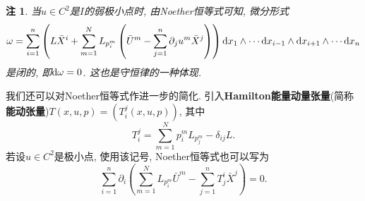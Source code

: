 \documentclass[12pt,a4paper]{article}
\newtheorem{remark}[theorem]{注}
\begin{document}
\begin{remark}
    当$u \in C^2$是$I$的弱极小点时, 由Noether恒等式可知, 微分形式 
    \begin{equation*}
        \omega = \sum_{i = 1}^n\left(L\bar{X}^i + \sum_{m = 1}^NL_{p_i^m}\left(\bar{U}^m - \sum_{j = 1}^n\partial_ju^m\bar{X}^j\right)\right) {\rm d}x_1 \wedge \cdots {\rm d}x_{i - 1} \wedge {\rm d}x_{i + 1} \wedge \cdots {\rm d}x_n
    \end{equation*}
    是闭的, 即${\rm d}\omega = 0$. 这也是守恒律的一种体现.
\end{remark}

我们还可以对Noether恒等式作进一步的简化. 引入\textbf{Hamilton能量动量张量}(简称\textbf{能动张量})$T(x, u, p) = (T_i^j(x, u, p))$, 其中
\begin{equation*}
    T_i^j = \sum_{m = 1}^Np_i^mL_{p_j^m} - \delta_{ij}L.
\end{equation*} 
若设$u \in C^2$是极小点, 使用该记号, Noether恒等式也可以写为
\begin{equation*}
    \boxed{\sum_{i = 1}^n\partial_i\left(\sum_{m = 1}^NL_{p_i^m}\bar{U}^m - \sum_{j = 1}^nT_j^i\bar{X}^j\right) = 0.}
\end{equation*}
\end{document}
